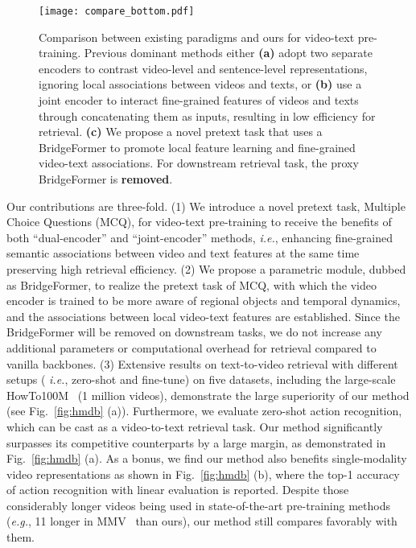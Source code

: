 \documentclass[10pt,twocolumn,letterpaper]{article}
\begin{document}
\begin{figure}
	\centering
	\texttt{[image: compare\_bottom.pdf]}
	\caption{Comparison between existing paradigms and ours for video-text pre-training. Previous dominant methods 
		either \textbf{(a)} adopt two separate encoders to contrast video-level and sentence-level representations, ignoring local associations between videos and texts, or \textbf{(b)} use a joint encoder to interact fine-grained features of videos and texts through concatenating them as inputs, resulting in low efficiency for retrieval. \textbf{(c)} We propose a novel pretext task that uses a BridgeFormer to promote local feature learning and fine-grained video-text associations. For downstream retrieval task, the proxy BridgeFormer is \textbf{removed}.}
	\label{fig:compare}
	\vspace{-4mm}	
\end{figure}

 
Our contributions are three-fold.
(1) We introduce a novel pretext task, Multiple Choice Questions (MCQ), for video-text pre-training to receive the benefits of both ``dual-encoder'' and ``joint-encoder'' methods, \textit{i.e.}, enhancing fine-grained semantic associations between video and text features at the same time preserving high retrieval efficiency. 
(2) We propose a parametric module, dubbed as BridgeFormer, to realize the pretext task of MCQ, with which the video encoder is trained to be more aware of regional objects and temporal dynamics, and the associations between local video-text features are established.
Since the BridgeFormer will be removed on downstream tasks, 
we do not increase any additional parameters or computational overhead for retrieval compared to vanilla backbones.
(3) Extensive results on text-to-video retrieval with different setups ( \textit{i.e.}, zero-shot and fine-tune) on five datasets, including the large-scale HowTo100M~\cite{howto100m} (1 million videos), demonstrate the large superiority of our method (see Fig.~\ref{fig:hmdb} (a)). 
Furthermore, we evaluate zero-shot action recognition, which can be cast as a video-to-text retrieval task.
Our method significantly surpasses its competitive counterparts by a large margin, as demonstrated in Fig.~\ref{fig:hmdb} (a).
As a bonus, we find our method also benefits single-modality video representations as shown in Fig.~\ref{fig:hmdb} (b), where the top-1 accuracy of action recognition with linear evaluation is reported.
Despite those considerably longer videos being used in state-of-the-art pre-training methods (\textit{e.g.}, 11 longer in MMV~\cite{MMV} than ours), our method still compares favorably with them.
\end{document}
